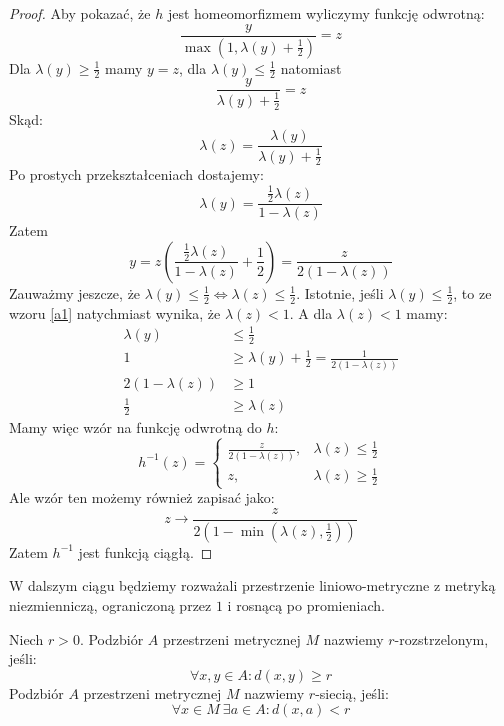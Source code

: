 \begin{lem}
\begin{proof}
    Aby pokazać, że $h$ jest homeomorfizmem wyliczymy funkcję odwrotną:
    \[
      \frac{y}{\max\left(1, \lambda(y) + \frac{1}{2}\right)} = z
    \]
    Dla $\lambda(y) \geq \frac{1}{2}$ mamy $y = z$, dla $\lambda(y) \leq \frac{1}{2}$ natomiast 
    \[
      \frac{y}{\lambda(y) + \frac{1}{2}} = z
    \]
    Skąd:
    \begin{equation}
      \label{a1}
      \lambda(z) = \frac{\lambda(y)}{\lambda(y) + \frac{1}{2}}
    \end{equation}
    Po prostych przekształceniach dostajemy:
    \[
      \lambda(y) = \frac{\frac{1}{2} \lambda(z)}{1 - \lambda(z)}
    \]
    Zatem
    \[
      y = z\left(\frac{\frac{1}{2} \lambda(z)}{1 - \lambda(z)} + \frac{1}{2}\right) = \frac{z}{2(1-\lambda(z))}
    \]
    Zauważmy jeszcze, że $\lambda(y) \leq \frac{1}{2} \iff \lambda(z) \leq \frac{1}{2}$. Istotnie, jeśli $\lambda(y) \leq \frac{1}{2}$, to ze wzoru \eqref{a1} natychmiast wynika, że $\lambda(z) < 1$. A dla $\lambda(z) < 1$ mamy:
    \begin{align*}
      \lambda(y) &\leq \frac{1}{2} \\
      1 &\geq \lambda(y) + \frac{1}{2} = \frac{1}{2(1-\lambda(z))} \\
      2(1-\lambda(z)) &\geq 1 \\
      \frac{1}{2} &\geq \lambda(z)
    \end{align*}
    Mamy więc wzór na funkcję odwrotną do $h$:
    \[
      h^{-1}(z) = 
      \begin{cases}
        \frac{z}{2(1-\lambda(z))},&\lambda(z) \leq \frac{1}{2} \\
        z,&\lambda(z) \geq \frac{1}{2}
      \end{cases}
    \]
    Ale wzór ten możemy również zapisać jako:
    \[
      z \to \frac{z}{2(1-\min(\lambda(z), \frac{1}{2}))}
    \]
    Zatem $h^{-1}$ jest funkcją ciągłą.
  \end{proof}
\end{lem}

W dalszym ciągu będziemy rozważali przestrzenie liniowo-metryczne z metryką niezmienniczą, ograniczoną przez $1$ i rosnącą po promieniach.

\begin{df}
  Niech $r > 0$. Podzbiór $A$ przestrzeni metrycznej $M$ nazwiemy $r$-rozstrzelonym, jeśli:
  \[
    \forall x, y \in A: d(x,y) \geq r
  \]
  Podzbiór $A$ przestrzeni metrycznej $M$ nazwiemy $r$-siecią, jeśli:
  \[
    \forall x \in M\ \exists a \in A: d(x,a) < r
  \]
\end{df}

